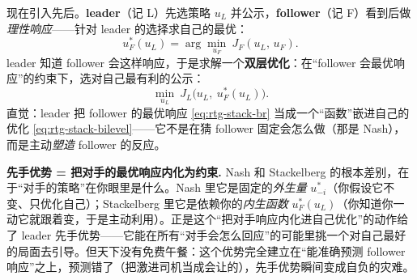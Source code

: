 现在引入先后。\textbf{leader}（记 L）先选策略 $u_L$ 并公示，\textbf{follower}（记 F）看到后做\emph{理性响应}——针对 leader 的选择求自己的最优：
\begin{equation}
  u_F^*(u_L)=\arg\min_{u_F}\ J_F(u_L,\,u_F).
  \label{eq:rtg-stack-br}
\end{equation}
leader 知道 follower 会这样响应，于是求解一个\textbf{双层优化}：在“follower 会最优响应”的约束下，选对自己最有利的公示：
\begin{equation}
  \min_{u_L}\ J_L\big(u_L,\ u_F^*(u_L)\big).
  \label{eq:rtg-stack-bilevel}
\end{equation}
直觉：leader 把 follower 的最优响应 \cref{eq:rtg-stack-br} 当成一个“函数”嵌进自己的优化 \cref{eq:rtg-stack-bilevel}——它不是在猜 follower 固定会怎么做（那是 Nash），而是主动\emph{塑造} follower 的反应。

\begin{insight}
\textbf{先手优势 = 把对手的最优响应内化为约束.}\;
Nash 和 Stackelberg 的根本差别，在于“对手的策略”在你眼里是什么。Nash 里它是固定的\emph{外生量} $u_{-i}^*$（你假设它不变、只优化自己）；Stackelberg 里它是依赖你的\emph{内生函数} $u_F^*(u_L)$（你知道你一动它就跟着变，于是主动利用）。正是这个“把对手响应内化进自己优化”的动作给了 leader 先手优势——它能在所有“对手会怎么回应”的可能里挑一个对自己最好的局面去引导。但天下没有免费午餐：这个优势完全建立在“能准确预测 follower 响应”之上，预测错了（把激进司机当成会让的），先手优势瞬间变成自负的灾难。
\end{insight}

